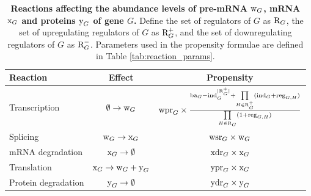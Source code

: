 

\begin{table}[ht]
	\caption{\textbf{Reactions affecting the abundance levels of pre-mRNA $\text{w}_{G}$, mRNA $\text{x}_{G}$ and proteins $\text{y}_{G}$ of gene $G$.} Define the set of regulators of $G$ as $\text{R}_{G}$, the set of upregulating regulators of $G$ as $\text{R}^+_{G}$, and the set of downregulating regulators of $G$ as $\text{R}^-_{G}$. Parameters used in the propensity formulae are defined in Table \ref{tab:reaction_params}.} \label{tab:reaction_def}
	\centering
	\begin{tabular}{|lcc|}
		\hline
		Reaction & Effect & Propensity \\ \hline \hline
		Transcription & $\emptyset \rightarrow \text{w}_{G}$ & $\text{wpr}_{G} \times \frac{\text{ba}_{G} - \text{ind}_{G}^{|\text{R}^+_{G}|} + \prod\limits_{H \in \text{R}^+_{G}}(\text{ind}_{G} + \text{reg}_{G,H})}{\prod\limits_{H \in \text{R}_{G}}(1 + \text{reg}_{G,H})}$ \\
		Splicing & $\text{w}_{G} \rightarrow \text{x}_{G}$ & $\text{wsr}_{G} \times \text{w}_{G}$ \\
		mRNA degradation & $\text{x}_{G} \rightarrow \emptyset$ & $\text{xdr}_{G} \times \text{x}_{G}$ \\
		Translation & $\text{x}_{G} \rightarrow \text{w}_{G} + \text{y}_{G}$ & $\text{ypr}_{G} \times \text{x}_{G}$ \\
		Protein degradation & $\text{y}_{G} \rightarrow \emptyset$ & $\text{ydr}_{G} \times \text{y}_{G}$ \\ \hline
	\end{tabular}
\end{table}



